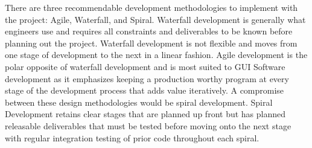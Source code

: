 \documentclass[12pt]{article}
\begin{document}
\indent
There are three recommendable development methodologies to implement with the project: Agile, Waterfall, and Spiral.  Waterfall development is generally what engineers use and requires all constraints and deliverables to be known before planning out the project.  Waterfall development is not flexible and moves from one stage of development to the next in a linear fashion.  Agile development is the polar opposite of waterfall development and is most suited to GUI Software development as it emphasizes keeping a production worthy program at every stage of the development process that adds value iteratively.  A compromise between these design methodologies would be spiral development.  Spiral Development retains clear stages that are planned up front but has planned releasable deliverables that must be tested before moving onto the next stage with regular integration testing of prior code throughout each spiral.\\

\hfill \\
\pagebreak
\hfill \\
\hfill
\end{document}
